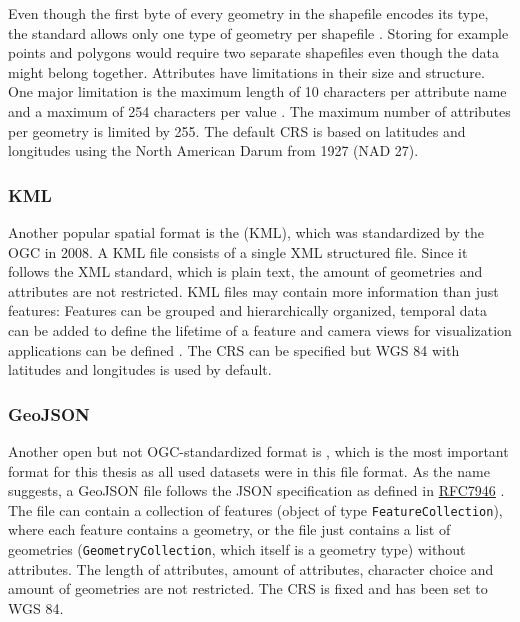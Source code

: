 			Even though the first byte of every geometry in the shapefile encodes its type, the standard allows only one type of geometry per shapefile \cite{esri-shapefile-spec}.
			Storing for example points and polygons would require two separate shapefiles even though the data might belong together.
			Attributes have limitations in their size and structure.
			One major limitation is the maximum length of 10 characters per attribute name and a maximum of 254 characters per value \cite{esri-shapefile-limitations}.
			The maximum number of attributes per geometry is limited by 255.
			The default CRS is based on latitudes and longitudes using the North American Darum from 1927 (NAD 27)\cite{esri-shapefile-coordinate-system}.
			
		\subsubsection{KML}
		
			Another popular spatial format is the  (KML), which was standardized by the OGC in 2008\cite{ogc-kml-2.2}.
			A KML file consists of a single XML structured file.
			Since it follows the XML standard, which is plain text, the amount of geometries and attributes are not restricted.
			KML files may contain more information than just features:
			Features can be grouped and hierarchically organized, temporal data can be added to define the lifetime of a feature and camera views for visualization applications can be defined \cite{ogc-kml-2.3}.
			The CRS can be specified but WGS 84 with latitudes and longitudes is used by default.
		
		\subsubsection{GeoJSON}
		\label{subsubsec:geojson}
		
			Another open but not OGC-standardized format is , which is the most important format for this thesis as all used datasets were in this file format.
			As the name suggests, a GeoJSON file follows the JSON specification as defined in \href{https://datatracker.ietf.org/doc/html/rfc7946}{RFC7946} \cite{ietf-geojson}.
			The file can contain a collection of features (object of type \texttt{FeatureCollection}), where each feature contains a geometry, or the file just contains a list of geometries (\texttt{GeometryCollection}, which itself is a geometry type) without attributes.
			The length of attributes, amount of attributes, character choice and amount of geometries are not restricted.
			The CRS is fixed and has been set to WGS 84.
			
